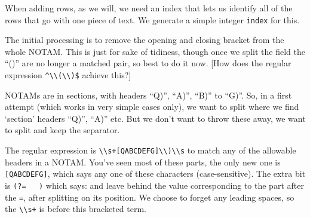 \documentclass[
]{book}
\begin{document}
When adding rows, as we will, we need an index that lets us identify all of the rows that go with one piece of text. We generate a simple integer \texttt{index} for this.

The initial processing is to remove the opening and closing bracket from the whole NOTAM. This is just for sake of tidiness, though once we split the field the ``()'' are no longer a matched pair, so best to do it now. {[}How does the regular expression \texttt{\^{}\textbackslash{}\textbackslash{}(\textbar{}\textbackslash{}\textbackslash{})\$} achieve this?{]}

NOTAMs are in sections, with headers ``Q)'', ``A)'', ``B)'' to ``G)''. So, in a first attempt (which works in very simple cases only), we want to split where we find `section' headers ``Q)'', ``A)'' etc. But we don't want to throw these away, we want to split and keep the separator.

The regular expression is \texttt{\textbackslash{}\textbackslash{}s+{[}QABCDEFG{]}\textbackslash{}\textbackslash{})\textbackslash{}\textbackslash{}s} to match any of the allowable headers in a NOTAM. You've seen most of these parts, the only new one is \texttt{{[}QABCDEFG{]}}, which says any one of these characters (case-sensitive). The extra bit is \texttt{(?=\ \ \ )} which says: and leave behind the value corresponding to the part after the \texttt{=}, after splitting on its position. We choose to forget any leading spaces, so the \texttt{\textbackslash{}\textbackslash{}s+} is before this bracketed term.
\end{document}
